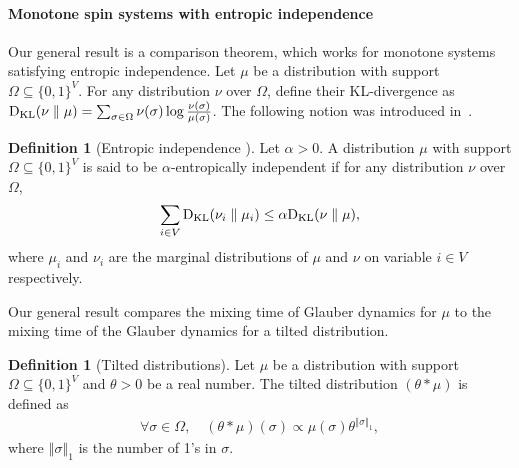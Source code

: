 \documentclass[11pt,a4paper]{article}
\newcommand{\normone}[1]{\left\Vert #1 \right\Vert_1}
\theoremstyle{definition}
\newtheorem{definition}[theorem]{Definition}
\begin{document}
\paragraph{Monotone spin systems with entropic independence}
Our general result is a comparison theorem, which works for monotone systems satisfying entropic independence. Let $\mu$ be a distribution with support $\Omega \subseteq \{0,1\}^V$. For any distribution $\nu$ over $\Omega$, define their KL-divergence as $\mathrm{D}_{\textnormal{KL}}(\nu\parallel \mu)= \sum_{\sigma\in \Omega}\nu(\sigma)\log \frac{\nu(\sigma)}{\mu(\sigma)}$. The following notion was introduced in~\cite{AJKPV22}.
\begin{definition}[Entropic independence \cite{AJKPV22}]
    Let $\alpha>0$. A distribution $\mu$ with support $\Omega \subseteq \{0,1\}^V$ is said to be $\alpha$-entropically independent if for any distribution $\nu$ over $\Omega$,
    \begin{align}\label{eq:entropic-independence}
    \sum_{i\in V}\mathrm{D}_{\textnormal{KL}}(\nu_i\parallel \mu_i)\leq \alpha \mathrm{D}_{\textnormal{KL}}(\nu\parallel \mu),
    \end{align}
    where $\mu_i$ and $\nu_i$ are the marginal distributions of $\mu$ and $\nu$ on variable $i \in V$ respectively. %
\end{definition}

Our general result compares the mixing time of Glauber dynamics for $\mu$ to the mixing time of the Glauber dynamics for a tilted distribution.

\begin{definition}[Tilted distributions]
    Let $\mu$ be a distribution with support $\Omega \subseteq \{0,1\}^V$ and $\theta > 0$ be a real number. The tilted distribution $(\theta * \mu)$ is defined as 
    \begin{align}
    \forall \sigma \in \Omega, \quad (\theta * \mu)(\sigma) \propto \mu(\sigma)\theta^{\normone{\sigma}},
    \end{align}
    where $\normone{\sigma}$ is the number of 1's in $\sigma$.
\end{definition}
\end{document}
